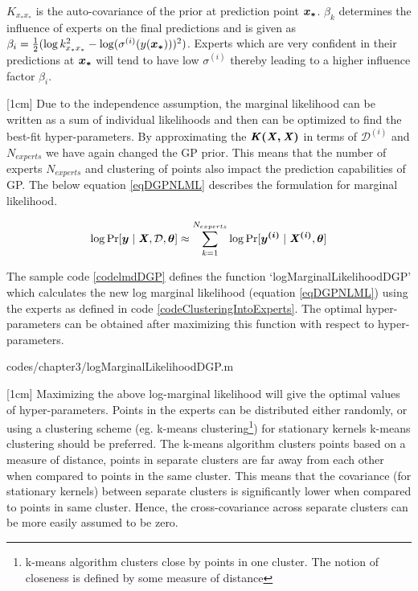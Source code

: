 $K_{x_{*}x_{*}}$ is the auto-covariance of the prior at prediction point $\boldsymbol{x_{*}}$. $\beta_{k}$ determines the influence of experts on the final predictions \cite{caoF14} and is given as $\beta_{i} = \frac{1}{2}(\log k_{x_{*}x_{*}}^{2} - \log(\sigma^{(i)}(y(\boldsymbol{x_{*}})))^{2})$. Experts which are very confident in their predictions at $\boldsymbol{x_{*}}$ will tend to have low $\sigma^{(i)}$ thereby leading to a higher influence factor $\beta_{i}$.

[1cm]
Due to the independence assumption, the marginal likelihood can be written as a sum of individual likelihoods and then can be optimized to find the best-fit hyper-parameters. By approximating the $\bm{\mathit{K(X, X)}}$ in terms of $\mathcal{D}^{(i)}$ and $N_{experts}$ we have again changed the GP prior. This means that the number of experts $N_{experts}$ and clustering of points also impact the prediction capabilities of GP. The below equation \ref{eqDGPNLML} describes the formulation for marginal likelihood. 

\begin{align}\label{eqDGPNLML}
    \log \Pr[\boldsymbol{y} \mid \bm{\mathit{X}}, \mathcal{D}, \boldsymbol{\theta}] \approx \sum_{k=1}^{N_{experts}} \log \Pr[\boldsymbol{y^{(i)}}\mid \bm{\mathit{X^{(i)}}}, \boldsymbol{\theta}]
 \end{align}

The sample code \ref{codelmdDGP} defines the function `logMarginalLikelihoodDGP' which calculates the new log marginal likelihood (equation \ref{eqDGPNLML}) using the experts as defined in code \ref{codeClusteringIntoExperts}. The optimal hyper-parameters can be obtained after maximizing this function with respect to hyper-parameters. 

\begin{mdframed}[hidealllines=true,backgroundcolor=lightgray!20]

                    {codes/chapter3/logMarginalLikelihoodDGP.m}
\end{mdframed}

[1cm]
Maximizing the above log-marginal likelihood will give the optimal values of hyper-parameters. Points in the experts can be distributed either randomly, or using a clustering scheme (eg. k-means clustering\footnote{k-means algorithm clusters close by points in one cluster. The notion of closeness is defined by some measure of distance}) for stationary kernels k-means clustering should be preferred. The k-means algorithm clusters points based on a measure of distance, points in separate clusters are far away from each other when compared to points in the same cluster. This means that the covariance (for stationary kernels) between separate clusters is significantly lower when compared to points in same cluster. Hence, the cross-covariance across separate clusters can be more easily assumed to be zero.

